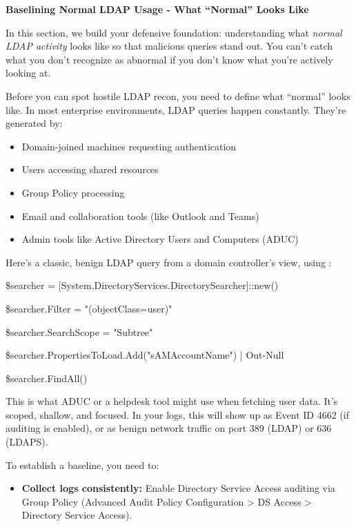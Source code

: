 {{\textbf{Baselining Normal LDAP Usage - What “Normal” Looks Like}

In this section, we build your defensive foundation: understanding what \textit{normal LDAP activity }looks like so that malicious queries stand out. You can’t catch what you don’t recognize as abnormal if you don’t know what you’re actively looking at.

Before you can spot hostile LDAP recon, you need to define what “normal” looks like. In most enterprise environments, LDAP queries happen constantly. They’re generated by:

\begin{itemize}
    \item Domain-joined machines requesting authentication

    \item Users accessing shared resources

    \item Group Policy processing

    \item Email and collaboration tools (like Outlook and Teams)

    \item Admin tools like Active Directory Users and Computers (ADUC)

\end{itemize}
Here’s a classic, benign LDAP query from a domain controller’s view, using  :

 

 

\$searcher = [System.DirectoryServices.DirectorySearcher]::new()

\$searcher.Filter = "(objectClass=user)"

\$searcher.SearchScope = "Subtree"

\$searcher.PropertiesToLoad.Add("sAMAccountName") | Out-Null

\$searcher.FindAll()

This is what ADUC or a helpdesk tool might use when fetching user data. It’s scoped, shallow, and focused. In your logs, this will show up as Event ID 4662 (if auditing is enabled), or as benign network traffic on port 389 (LDAP) or 636 (LDAPS).

To establish a baseline, you need to:

\begin{itemize}
    \item \textbf{Collect logs consistently:} Enable Directory Service Access auditing via Group Policy (Advanced Audit Policy Configuration > DS Access > Directory Service Access).


\end{itemize}}}
